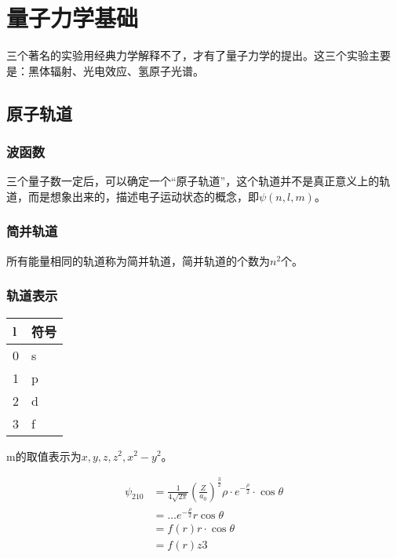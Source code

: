 \chapter{量子力学基础}

三个著名的实验用经典力学解释不了，才有了量子力学的提出。这三个实验主要是：黑体辐射、光电效应、氢原子光谱。







\section{原子轨道}

\subsection{波函数}

三个量子数一定后，可以确定一个“原子轨道”，这个轨道并不是真正意义上的轨道，而是想象出来的，描述电子运动状态的概念，即$\psi(n, l, m)$。


\subsection{简并轨道}


所有能量相同的轨道称为简并轨道，简并轨道的个数为$n^2$个。


\subsection{轨道表示}

\begin{table}[H]
    \centering
    \begin{tabular}{ll}
        \toprule
        l & 符号 \\ 
        \midrule
        0 & s \\
        1 & p \\ 
        2 & d \\
        3 & f \\
        \bottomrule
    \end{tabular}

\end{table}
m的取值表示为$x, y, z, z^2, x^2 - y^2$。

\begin{align*}
    \psi_{210} &= \frac{1}{4 \sqrt{2 \pi}} \left( \frac{Z}{a_0} \right)^{\frac{3}{2}} \rho \cdot e^{-\frac{\rho}{2}} \cdot \cos \theta \\ 
    &= \dots e^{-\frac{\rho}{2}} r \cos \theta \\
    &= f(r) r \cdot \cos \theta \\
    &= f(r) z3
\end{align*}
